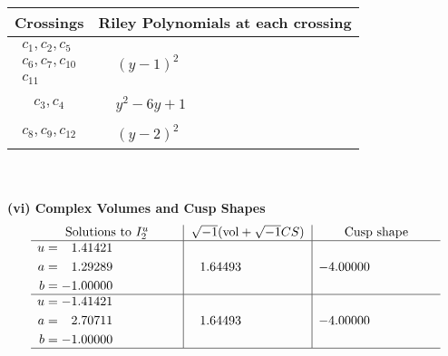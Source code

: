 \documentclass[1p]{elsarticle_modified}
\theoremstyle{definition}
\newcommand{\I}{\sqrt{-1}}
\begin{document}
\begin{tabular}{m{50pt}|m{274pt}}
Crossings & \hspace{64pt}Riley Polynomials at each crossing \\
\hline $$\begin{aligned}c_{1},c_{2},c_{5}\\c_{6},c_{7},c_{10}\\c_{11}\end{aligned}$$&$\begin{aligned}
&(y-1)^2
\end{aligned}$\\
\hline $$\begin{aligned}c_{3},c_{4}\end{aligned}$$&$\begin{aligned}
&y^2-6 y+1
\end{aligned}$\\
\hline $$\begin{aligned}c_{8},c_{9},c_{12}\end{aligned}$$&$\begin{aligned}
&(y-2)^2
\end{aligned}$\\
\hline
\end{tabular}\\~\\
\newpage\flushleft \textbf{(vi) Complex Volumes and Cusp Shapes}
$$\begin{array}{c|c|c}  
\text{Solutions to }I^u_{2}& \I (\text{vol} + \sqrt{-1}CS) & \text{Cusp shape}\\
 \hline 
\begin{aligned}
u &= \phantom{-}1.41421\phantom{ +0.000000I} \\
a &= \phantom{-}1.29289\phantom{ +0.000000I} \\
b &= -1.00000\phantom{ +0.000000I}\end{aligned}
 & \phantom{-}1.64493\phantom{ +0.000000I} & -4.00000\phantom{ +0.000000I} \\ \hline\begin{aligned}
u &= -1.41421\phantom{ +0.000000I} \\
a &= \phantom{-}2.70711\phantom{ +0.000000I} \\
b &= -1.00000\phantom{ +0.000000I}\end{aligned}
 & \phantom{-}1.64493\phantom{ +0.000000I} & -4.00000\phantom{ +0.000000I}\\
 \hline 
 \end{array}$$\newpage\newpage\renewcommand{\arraystretch}{1}
\end{document}
